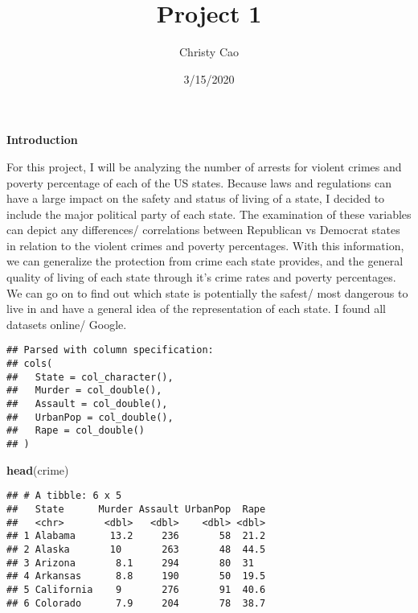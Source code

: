 \documentclass[]{article}
\title{Project 1}
\author{Christy Cao}
\date{3/15/2020}
\newenvironment{Shaded}{\begin{snugshade}}{\end{snugshade}}
\newcommand{\CommentTok}[1]{\textcolor[rgb]{0.56,0.35,0.01}{\textit{#1}}}
\newcommand{\KeywordTok}[1]{\textcolor[rgb]{0.13,0.29,0.53}{\textbf{#1}}}
\newcommand{\NormalTok}[1]{#1}
\newcommand{\StringTok}[1]{\textcolor[rgb]{0.31,0.60,0.02}{#1}}
\begin{document}
\maketitle

\textbf{Introduction}

For this project, I will be analyzing the number of arrests for violent
crimes and poverty percentage of each of the US states. Because laws and
regulations can have a large impact on the safety and status of living
of a state, I decided to include the major political party of each
state. The examination of these variables can depict any differences/
correlations between Republican vs Democrat states in relation to the
violent crimes and poverty percentages. With this information, we can
generalize the protection from crime each state provides, and the
general quality of living of each state through it's crime rates and
poverty percentages. We can go on to find out which state is potentially
the safest/ most dangerous to live in and have a general idea of the
representation of each state. I found all datasets online/ Google.

\begin{Shaded}
\end{Shaded}

\begin{verbatim}
## Parsed with column specification:
## cols(
##   State = col_character(),
##   Murder = col_double(),
##   Assault = col_double(),
##   UrbanPop = col_double(),
##   Rape = col_double()
## )
\end{verbatim}

\begin{Shaded}
\begin{Highlighting}[]
\KeywordTok{head}\NormalTok{(crime)}
\end{Highlighting}
\end{Shaded}

\begin{verbatim}
## # A tibble: 6 x 5
##   State      Murder Assault UrbanPop  Rape
##   <chr>       <dbl>   <dbl>    <dbl> <dbl>
## 1 Alabama      13.2     236       58  21.2
## 2 Alaska       10       263       48  44.5
## 3 Arizona       8.1     294       80  31  
## 4 Arkansas      8.8     190       50  19.5
## 5 California    9       276       91  40.6
## 6 Colorado      7.9     204       78  38.7
\end{verbatim}
\end{document}
